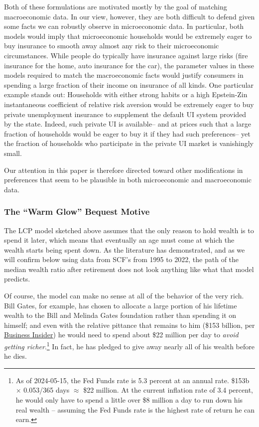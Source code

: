 \documentclass{article}
\begin{document}
Both of these formulations are motivated mostly by the goal of matching macroeconomic data.
In our view, however, they are both difficult to defend given some facts we can robustly observe in microeconomic data.
In particular, both models would imply that microeconomic households would be extremely eager to buy insurance to smooth away almost any risk to their microeconomic circumstances.
While people do typically have insurance against large risks (fire insurance for the home, auto insurance for the car), the parameter values in these models required to match the macroeconomic facts would justify consumers in spending a large fraction of their income on insurance of all kinds.
One particular example stands out: Households with either strong habits or a high Epstein-Zin instantaneous coefficient of relative risk aversion would be extremely eager to buy private unemployment insurance to supplement the default UI system provided by the state.
Indeed, such private UI is available-- and at prices such that a large fraction of households would be eager to buy it if they had such preferences-- yet the fraction of households who participate in the private UI market is vanishingly small.

Our attention in this paper is therefore directed toward other modifications in preferences that seem to be plausible in both microeconomic and macroeconomic data.

\subsubsection{The ``Warm Glow'' Bequest Motive}

The LCP model sketched above assumes that the only reason to hold wealth is to spend it later, which means that eventually an age must come at which the wealth starts being spent down.
As the literature has demonstrated, and as we will confirm below using data from SCF's from 1995 to 2022, the path of the median wealth ratio after retirement does not look anything like what that model predicts.

Of course, the model can make no sense at all of the behavior of the very rich.
Bill Gates, for example, has chosen to allocate a large portion of his lifetime wealth to the Bill and Melinda Gates foundation rather than spending it on himself; and even with the relative pittance that remains to him (\$153 billion, per \href{https://www.businessinsider.com/how-bill-gates-spends-fortune}{Business Insider}) he would need to spend about \$22 million per day to \textit{avoid getting richer}.\footnote{As of 2024-05-15, the Fed Funds rate is 5.3 percent at an annual rate.
\$153b $\times$ 0.053/365 days $\approx$ \$22 million.
At the current inflation rate of 3.4 percent, he would only have to spend a little over \$8 million a day to run down his real wealth -- assuming the Fed Funds rate is the highest rate of return he can earn.}
In fact, he has pledged to give away nearly all of his wealth before he dies.
\end{document}
